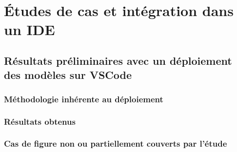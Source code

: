 \chapter{Études de cas et intégration dans un IDE}
    \section{Résultats préliminaires avec un déploiement des modèles sur VSCode}
        \subsection{Méthodologie inhérente au déploiement}
        \subsection{Résultats obtenus}
        \subsection{Cas de figure non ou partiellement couverts par l'étude}